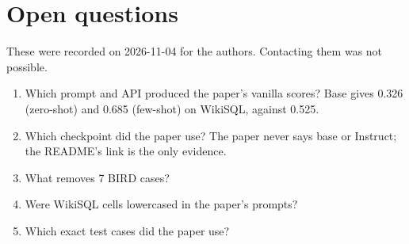 \section{Open questions}\label{sec:open-questions}

These were recorded on 2026-11-04 for the authors. Contacting them was not possible.
\begin{enumerate}
\item Which prompt and API produced the paper's vanilla scores? Base gives 0.326 (zero-shot) and 0.685 (few-shot) on
WikiSQL, against 0.525.
\item Which checkpoint did the paper use? The paper never says base or Instruct; the README's link is the only evidence.
\item What removes 7 BIRD cases?
\item Were WikiSQL cells lowercased in the paper's prompts?
\item Which exact test cases did the paper use?
\end{enumerate}
